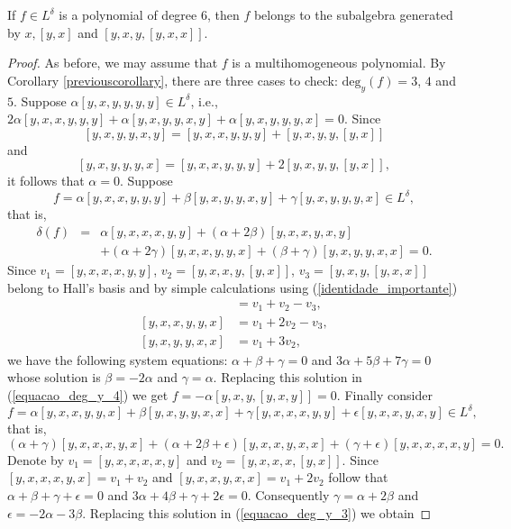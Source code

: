 \documentclass{cimart}
\begin{document}
\begin{proposition}
If $f \in L^\delta$  is a polynomial of degree $6$, then $f $ belongs to the subalgebra generated by $x, [y, x]$ and $[y, x, y, [y, x, x]]$.
\end{proposition}
\begin{proof}As before, we may assume that $f$ is a multihomogeneous
polynomial. By Corollary \ref{previouscorollary}, there are three cases to check: $\mbox{deg}_y(f) = 3$, $4$ and $5$. Suppose $\alpha [y, x, y, y, y, y] \in L ^\delta$, i.e., $2\alpha [y, x, x, y, y, y] + \alpha [y, x, y, y, x, y] + \alpha [y, x, y, y, y, x] = 0$. Since 
$$[y, x, y, y, x, y] = [y, x, x, y, y, y] + [y, x, y, y, [y, x]]$$
and
$$[y, x, y, y, y, x] = [y, x, x, y, y, y] + 2[y, x, y, y, [y, x]],$$ 
it follows that $\alpha = 0$. Suppose
\begin{equation} \label{equacao_deg_y_4}
f = \alpha [y, x, x, y, y, y] + \beta [y, x, y, y, x, y] + \gamma [y, x, y, y, y, x] \in L^\delta, 
\end{equation}
that is, 
\begin{eqnarray*}
\delta(f) &=& \alpha [y, x, x, x, y, y] + (\alpha+ 2\beta) [y, x, x, y, x, y]\\
& &+ (\alpha + 2\gamma)[y, x, x, y, y, x]+ (\beta + \gamma)[y, x, y, y, x, x]=0.
\end{eqnarray*}
Since $v_1 = [y, x, x, x, y, y]$, $v_2 = [y, x, x, y, [y, x]]$, $v_3 = [y, x, y, [y, x, x]]$ belong to Hall's basis and by simple calculations using (\ref{identidade_importante}) 
\begin{align*}
[y, x, x, y, x, y] &= v_1 + v_2 - v_3,\\
[y, x, x, y, y, x] &= v_1 + 2v_2 - v_3,\\
[y, x, y, y, x, x] &= v_1 + 3v_2,
\end{align*}
we have the following system equations: $\alpha + \beta + \gamma = 0$ and $3 \alpha + 5 \beta + 7 \gamma = 0$  whose solution is $\beta = -2\alpha$ and $\gamma = \alpha$. Replacing this solution in (\ref{equacao_deg_y_4}) we get $f = - \alpha [y, x, y, [y, x, y]]  = 0$. Finally consider
\begin{equation} \label{equacao_deg_y_3}
f = \alpha [y, x, x, y, y, x] + \beta [y, x, y, y, x, x] + \gamma [y, x, x, x, y, y] + \epsilon [y, x, x, y, x, y]\in L^\delta, 
\end{equation}
that is, 
\[
(\alpha + \gamma) [y, x, x, x, y, x] + (\alpha + 2\beta + \epsilon)[y, x, x, y, x, x] + (\gamma + \epsilon)[y, x, x, x, x, y] = 0.
\]
Denote by $v_1 = [y, x, x, x, x, y]$ and $v_2 = [y, x, x, x, [y, x]]$. Since $[y, x, x, x, y, x] = v_1 + v_2$ and $[y, x, x, y, x, x] = v_1 + 2v_2$ follow that $\alpha + \beta + \gamma + \epsilon = 0$ and $3\alpha + 4\beta + \gamma + 2\epsilon = 0$. Consequently $\gamma = \alpha + 2\beta$ and $\epsilon = -2\alpha - 3\beta$. Replacing this solution in (\ref{equacao_deg_y_3}) we obtain 

\end{proof}
\end{document}
